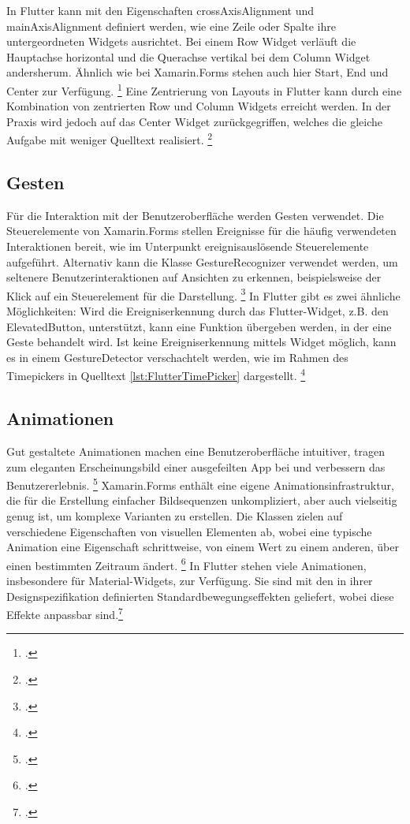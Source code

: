In Flutter kann mit den Eigenschaften \glq crossAxisAlignment\grq{} und \glq mainAxisAlignment\grq{} definiert werden, wie eine Zeile oder Spalte ihre untergeordneten Widgets ausrichtet. Bei einem \glq Row\grq{} Widget verläuft die Hauptachse horizontal und die Querachse vertikal bei dem \glq Column\grq{} Widget andersherum. Ähnlich wie bei Xamarin.Forms stehen auch hier \glq Start\grq ,  \glq End\grq{} und \glq Center\grq{} zur Verfügung. \footcite[Vgl.][Abgerufen am \today]{GoogleAlignWidgets}  Eine Zentrierung von Layouts in Flutter kann durch eine Kombination von zentrierten  \glq Row\grq{} und \glq Column\grq{} Widgets erreicht werden.  In der Praxis wird jedoch auf das \glq Center\grq{} Widget zurückgegriffen, welches die gleiche Aufgabe mit weniger Quelltext realisiert. \footcite[Vgl.][Abgerufen am \today]{GoogleCenter} 

\subsection{Gesten}
Für die Interaktion mit der Benutzeroberfläche werden Gesten verwendet.  Die Steuerelemente von Xamarin.Forms stellen Ereignisse für die häufig verwendeten Interaktionen bereit, wie im Unterpunkt ereignisauslösende Steuerelemente aufgeführt.  Alternativ kann die Klasse \glq GestureRecognizer\grq{}  verwendet werden, um seltenere Benutzerinteraktionen auf Ansichten zu erkennen, beispielsweise der Klick auf ein Steuerelement für die Darstellung.  \footcite[Vgl.][Abgerufen am \today]{MicrosoftGesten2020} 
In Flutter gibt es zwei ähnliche Möglichkeiten: Wird die Ereigniserkennung durch das Flutter-Widget,  z.B. den \glq ElevatedButton\grq , unterstützt,  kann eine Funktion übergeben werden,  in der eine Geste behandelt wird.  Ist keine Ereigniserkennung mittels Widget möglich,  kann es in einem \glq GestureDetector\grq{} verschachtelt werden, wie im Rahmen des \glq Timepickers\grq{} in Quelltext \ref{lst:FlutterTimePicker} dargestellt. \footcite[Vgl.][Abgerufen am \today]{GoogleGesture2020} 

\subsection{Animationen}
Gut gestaltete Animationen machen eine Benutzeroberfläche intuitiver, tragen zum eleganten Erscheinungsbild einer ausgefeilten App bei und verbessern das Benutzererlebnis.  \footcite[Vgl.][Abgerufen am \today]{GoogleFlutterAnimations2020} 
Xamarin.Forms enthält eine eigene Animationsinfrastruktur,  die für die Erstellung einfacher Bildsequenzen unkompliziert,  aber auch vielseitig genug ist,  um komplexe Varianten zu erstellen.  Die Klassen zielen auf verschiedene Eigenschaften von visuellen Elementen ab, wobei eine typische Animation eine Eigenschaft schrittweise, von einem Wert zu einem anderen, über einen bestimmten Zeitraum ändert. \footcite[Vgl.][Abgerufen am \today]{Microsoftanimations2020} 
In Flutter stehen viele Animationen,  insbesondere für Material-Widgets,  zur Verfügung.  Sie sind mit den in ihrer Designspezifikation definierten Standardbewegungseffekten geliefert,  wobei diese Effekte anpassbar sind.\footcite[Vgl.][Abgerufen am \today]{GoogleFlutterAnimations2020} 

